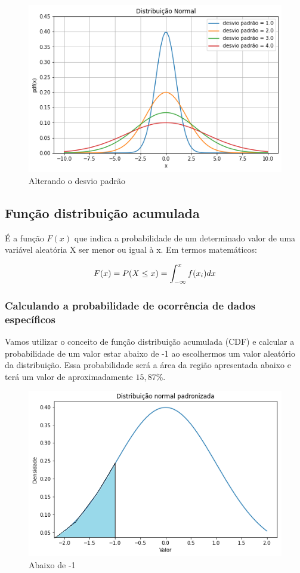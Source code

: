\begin{figure}[H]
	\centering
	\includegraphics[width=1\textwidth]{./Imagens/Distribuição Normal/GA4.png} 
	\caption{Alterando o desvio padrão}
	\label{fig:GA4}
\end{figure}

\subsection{Função distribuição acumulada}

É a função $F(x)$ que indica a probabilidade de um determinado valor de uma variável aleatória X ser menor ou igual à x. Em termos matemáticos:

\[\large F(x) = P(X \leq x) = \int_{-\infty }^{x}f(x_{i})dx\]

\subsubsection{Calculando a probabilidade de ocorrência de dados específicos}

Vamos utilizar o conceito de função distribuição acumulada (CDF) e calcular a probabilidade de um valor estar abaixo de -1 ao escolhermos um valor aleatório da distribuição. Essa probabilidade será a área da região apresentada abaixo e terá um valor de aproximadamente $15,87\%$.

\begin{figure}[H]
	\centering
	\includegraphics[width=1\textwidth]{./Imagens/Distribuição Normal/GA5.png} 
	\caption{Abaixo de -1}
	\label{fig:GA5}
\end{figure}

